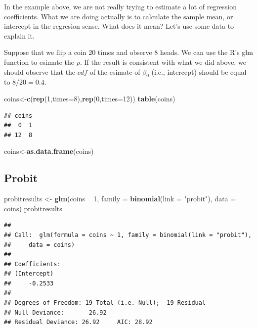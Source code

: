 \documentclass[]{book}
\newenvironment{Shaded}{\begin{snugshade}}{\end{snugshade}}
\newcommand{\KeywordTok}[1]{\textcolor[rgb]{0.13,0.29,0.53}{\textbf{#1}}}
\newcommand{\DataTypeTok}[1]{\textcolor[rgb]{0.13,0.29,0.53}{#1}}
\newcommand{\DecValTok}[1]{\textcolor[rgb]{0.00,0.00,0.81}{#1}}
\newcommand{\StringTok}[1]{\textcolor[rgb]{0.31,0.60,0.02}{#1}}
\newcommand{\OperatorTok}[1]{\textcolor[rgb]{0.81,0.36,0.00}{\textbf{#1}}}
\newcommand{\NormalTok}[1]{#1}
\begin{document}
In the example above, we are not really trying to estimate a lot of
regression coefficients. What we are doing actually is to calculate the
sample mean, or intercept in the regresion sense. What does it mean?
Let's use some data to explain it.

Suppose that we flip a coin 20 times and observe 8 heads. We can use the
R's glm function to esimate the \(\rho\). If the result is consistent
with what we did above, we should observe that the \(cdf\) of the
esimate of \(\beta_0\) (i.e., intercept) should be equal to
\(8/20=0.4\).

\begin{Shaded}
\begin{Highlighting}[]
\NormalTok{coins<-}\KeywordTok{c}\NormalTok{(}\KeywordTok{rep}\NormalTok{(}\DecValTok{1}\NormalTok{,}\DataTypeTok{times=}\DecValTok{8}\NormalTok{),}\KeywordTok{rep}\NormalTok{(}\DecValTok{0}\NormalTok{,}\DataTypeTok{times=}\DecValTok{12}\NormalTok{))}
\KeywordTok{table}\NormalTok{(coins)}
\end{Highlighting}
\end{Shaded}

\begin{verbatim}
## coins
##  0  1 
## 12  8
\end{verbatim}

\begin{Shaded}
\begin{Highlighting}[]
\NormalTok{coins<-}\KeywordTok{as.data.frame}\NormalTok{(coins)}
\end{Highlighting}
\end{Shaded}

\subsection{Probit}\label{probit-1}

\begin{Shaded}
\begin{Highlighting}[]
\NormalTok{probitresults <-}\StringTok{ }\KeywordTok{glm}\NormalTok{(coins }\OperatorTok{~}\StringTok{ }\DecValTok{1}\NormalTok{, }\DataTypeTok{family =} \KeywordTok{binomial}\NormalTok{(}\DataTypeTok{link =} \StringTok{"probit"}\NormalTok{), }\DataTypeTok{data =}\NormalTok{ coins)}
\NormalTok{probitresults}
\end{Highlighting}
\end{Shaded}

\begin{verbatim}
## 
## Call:  glm(formula = coins ~ 1, family = binomial(link = "probit"), 
##     data = coins)
## 
## Coefficients:
## (Intercept)  
##     -0.2533  
## 
## Degrees of Freedom: 19 Total (i.e. Null);  19 Residual
## Null Deviance:       26.92 
## Residual Deviance: 26.92     AIC: 28.92
\end{verbatim}
\end{document}
